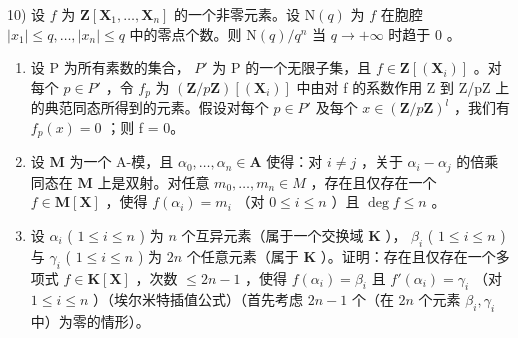 10) 设 \(f\) 为 \(\mathbf{Z}[\mathbf{X}_1, \ldots, \mathbf{X}_n]\) 的一个非零元素。设 \(\mathrm{N}(q)\) 为 \(f\) 在胞腔 \(|x_1| \leqslant q, \ldots, |x_n| \leqslant q\) 中的零点个数。则 \(\mathrm{N}(q) / q^n\) 当 \(q \to +\infty\) 时趋于 0 。

\begin{enumerate}
\def\labelenumi{\arabic{enumi})}
\setcounter{enumi}{10}
\item
  设 P 为所有素数的集合， \(P'\) 为 P 的一个无限子集，且 \(f \in \mathbf{Z}[(\mathbf{X}_i)]\) 。对每个 \(p \in P'\) ，令 \(f_p\) 为 \((\mathbf{Z}/p\mathbf{Z})[(\mathbf{X}_i)]\) 中由对 f 的系数作用 Z 到 Z/pZ 上的典范同态所得到的元素。假设对每个 \(p \in P'\) 及每个 \(x \in (\mathbf{Z}/p\mathbf{Z})^l\) ，我们有 \(f_p(x) = 0\) ；则 f = 0。
\item
  设 \(\mathbf{M}\) 为一个 A-模，且 \(\alpha_0, \ldots, \alpha_n \in \mathbf{A}\) 使得：对 \(i \neq j\) ，关于 \(\alpha_i - \alpha_j\) 的倍乘同态在 \(\mathbf{M}\) 上是双射。对任意 \(m_0, \ldots, m_n \in M\) ，存在且仅存在一个 \(f \in \mathbf{M}[\mathbf{X}]\) ，使得 \(f(\alpha_i) = m_i\) （对 \(0 \leqslant i \leqslant n\) ）且 \(\deg f \leqslant n\) 。
\item
  设 \(\alpha_{i}\) ( \(1 \leqslant i \leqslant n\) ) 为 \(n\) 个互异元素（属于一个交换域 \(\mathbf{K}\) ）， \(\beta_{i}\) ( \(1 \leqslant i \leqslant n\) ) 与 \(\gamma_{i}\) ( \(1 \leqslant i \leqslant n\) ) 为 \(2n\) 个任意元素（属于 \(\mathbf{K}\) ）。证明：存在且仅存在一个多项式 \(f \in \mathbf{K}[\mathbf{X}]\) ，次数 \(\leqslant 2n - 1\) ，使得 \(f(\alpha_{i}) = \beta_{i}\) 且 \(f'(\alpha_{i}) = \gamma_{i}\) （对 \(1 \leqslant i \leqslant n\) ）（埃尔米特插值公式）（首先考虑 \(2n - 1\) 个（在 \(2n\) 个元素 \(\beta_{i}, \gamma_{i}\) 中）为零的情形）。
\end{enumerate}

